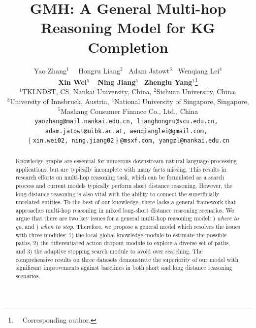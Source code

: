 \documentclass[11pt]{article}
\title{GMH: A General Multi-hop Reasoning Model for KG Completion}
\author{
Yao Zhang$^1$ \  \ Hongru Liang$^2$ \ Adam Jatowt$^3$ \ Wenqiang Lei$^4$ \\
 \textbf{Xin Wei}$^5$ \ \textbf{ Ning Jiang}$^5$ \ \textbf{Zhenglu Yang}$^{1}$\thanks{~~Corresponding author.}\vspace{1mm}\\
  \normalsize{$^1$TKLNDST, CS, Nankai University, China, $^2$Sichuan University, China, } \\
  \normalsize{$^3$University of Innsbruck, Austria, $^4$National University of Singapore, Singapore, } \\
  \normalsize{$^5$Mashang Consumer Finance Co., Ltd., China} \\
  \normalsize{\texttt{yaozhang@mail.nankai.edu.cn, lianghongru@scu.edu.cn, }}\\ 
  \normalsize{\texttt{adam.jatowt@uibk.ac.at, wenqianglei@gmail.com, }} \\
  \normalsize{\texttt{$\left \{ \right .$xin.wei02, ning.jiang02$\left.\right \}$@msxf.com, yangzl@nankai.edu.cn}} \\}
\begin{document}
\maketitle
\begin{abstract}
Knowledge graphs are essential for numerous downstream natural language processing applications, but are typically incomplete with many facts missing. This results in research efforts on multi-hop reasoning task, which can be formulated as a search process and current models typically perform short distance reasoning. However, the long-distance reasoning is also vital with the ability to connect the superficially unrelated entities. To the best of our knowledge, there lacks a general framework that approaches multi-hop reasoning in mixed long-short distance reasoning scenarios.
    We argue that there are two key issues for a general multi-hop reasoning model: {}) \textit{where to go}, and {}) \textit{when to stop}. Therefore, we propose a general model which resolves the issues with three modules: 1) the local-global knowledge module to estimate the possible paths, 2) the differentiated action dropout module to explore a diverse set of paths, and 3) the adaptive stopping search module to avoid over searching.
    The comprehensive results on three datasets demonstrate the superiority of our model with significant improvements against baselines in both short and long distance reasoning scenarios. 
\end{abstract}












\appendix


\end{document}
